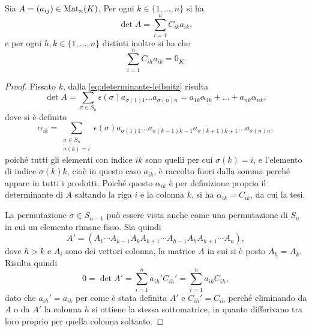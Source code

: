 \begin{teorema}[di Laplace]
	Sia $A=(a_{ij})\in\operatorname{Mat}_n(K)$.
	Per ogni $k\in\{1,\dots,n\}$ si ha
	\begin{equation} \label{eq:det-laplace1}
		\det A=\sum_{i=1}^nC_{ik}a_{ik},
	\end{equation}
	e per ogni $h,k\in\{1,\dots,n\}$ distinti inoltre si ha che
	\begin{equation} \label{eq:det-laplace2}
		\sum_{i=1}^nC_{ih}a_{ik}=0_K.
	\end{equation}
\end{teorema}
\begin{proof}
	Fissato $k$, dalla \eqref{eq:determinante-leibnitz} risulta
	\begin{equation*}
		\det A=\sum_{\sigma\in S_n}\epsilon(\sigma)a_{\sigma(1)1}\dots a_{\sigma(n)n}=a_{1k}\alpha_{1k}+\dots+a_{nk}\alpha_{nk},
	\end{equation*}
	dove si è definito
	\begin{equation*}
		\alpha_{ik}=\sum_{\substack{\sigma\in S_n\\\sigma(k)=i}}\epsilon(\sigma)a_{\sigma(1)1}\dots a_{\sigma(k-1)k-1}a_{\sigma(k+1)k+1}\dots a_{\sigma(n)n},
	\end{equation*}
	poiché tutti gli elementi con indice $ik$ sono quelli per cui $\sigma(k)=i$, e l'elemento di indice $\sigma(k)k$, cioè in questo caso $a_{ik}$, è raccolto fuori dalla somma perché appare in tutti i prodotti.
	Poiché questo $\alpha_{ik}$ è per definizione proprio il determinante di $A$ saltando la riga $i$ e la colonna $k$, si ha $\alpha_{ik}=C_{ik}$, da cui la tesi.

	La permutazione $\sigma\in S_{n-1}$ può essere vista anche come una permutazione di $S_n$ in cui un elemento rimane fisso. Sia quindi
	\begin{equation*}
		A'=(A_1\cdots A_{k-1}A_kA_{k+1}\cdots A_{h-1}A_hA_{h+1}\cdots A_n),
	\end{equation*}
	dove $h>k$ e $A_i$ sono dei vettori colonna, la matrice $A$ in cui si è posto $A_h=A_k$. Risulta quindi
	\begin{equation*}
		0=\det A'=\sum_{i=1}^na_{ih}'C_{ih}'=\sum_{i=1}^na_{ik}C_{ih},
	\end{equation*}
	dato che $a_{ih}'=a_{ik}$ per come è stata definita $A'$ e $C_{ih}'=C_{ih}$ perché eliminando da $A$ o da $A'$ la colonna $h$ si ottiene la stessa sottomatrice, in quanto differivano tra loro proprio per quella colonna soltanto.
\end{proof}


